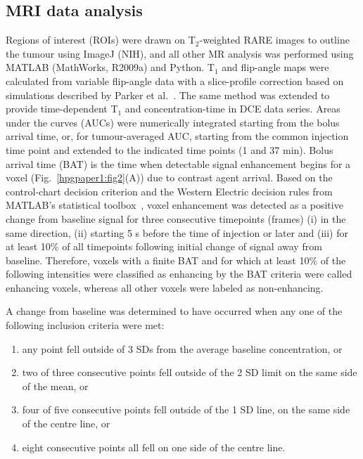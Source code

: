 \subsection{MRI data analysis}

Regions of interest (ROIs) were drawn on T$_2$-weighted \acs{RARE} images to outline the tumour using ImageJ (NIH), and all other MR analysis was performed using MATLAB (MathWorks, R2009a) and Python.
T$_1$ and flip-angle maps were calculated from variable flip-angle data with a slice-profile correction based on simulations described by Parker et al.~\cite{Parker:2001wj}.
The same method was extended to provide time-dependent T$_1$ and concentration-time in DCE data series.
Areas under the curves (AUCs) were numerically integrated starting from the bolus arrival time, or, for tumour-averaged AUC, starting from the common injection time point and extended to the indicated time points (1 and 37 min).
Bolus arrival time (BAT) is the time when detectable signal enhancement begins for a voxel (Fig.~\ref{hpgpaper1:fig2}(A)) due to contrast agent arrival.
Based on the control-chart decision criterion and the Western Electric decision rules from MATLAB’s statistical toolbox~\cite{Shewhart:1931tq}, voxel enhancement was detected as a positive change from baseline signal for three consecutive timepoints (frames) (i) in the same direction, (ii) starting 5 s before the time of injection or later and (iii) for at least 10\% of all timepoints following initial change of signal away from baseline.
Therefore, voxels with a finite \acs{BAT} and for which at least 10\% of the following intensities were classified as enhancing by the \acs{BAT} criteria were called enhancing voxels, whereas all other voxels were labeled as non-enhancing.

A change from baseline was determined to have occurred
when any one of the following inclusion criteria were met:

\begin{enumerate}
	\item any point fell outside of 3 SDs from the average baseline concentration, or
	\item two of three consecutive points fell outside of the 2 SD limit on the same side of the mean, or
	\item four of five consecutive points fell outside of the 1 SD line, on the same side of the centre line, or
	\item eight consecutive points all fell on one side of the centre line.
\end{enumerate}

